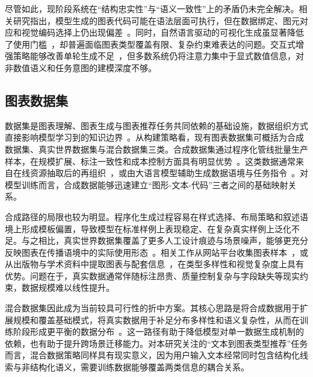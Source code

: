 尽管如此，现阶段系统在“结构忠实性”与“语义一致性”上的矛盾仍未完全解决。相关研究指出，模型生成的图表代码可能在语法层面可执行，但在数据绑定、图元对应和视觉编码选择上仍出现偏差~\cite{kondic_chartgen_2025}。同时，自然语言驱动的可视化生成虽显著降低了使用门槛~\cite{wang_towards_2022,lu_automatic_2021,wang_making_2023}，却普遍面临图表类型覆盖有限、复杂约束难表达的问题。交互式增强策略能够改善单轮生成不足~\cite{masson_charagraph_2023,zou_gistvis_2025}，但多数系统仍将注意力集中于显式数值信息，对非数值语义和任务意图的建模深度不够。


\subsection{图表数据集}

数据集是图表理解、图表生成与图表推荐任务共同依赖的基础设施，数据组织方式直接影响模型学习到的知识边界~\cite{hu_novachart_2024}。从构建策略看，现有图表数据集可概括为合成数据集、真实世界数据集与混合数据集三类。合成数据集通过程序化管线批量生产样本，在规模扩展、标注一致性和成本控制方面具有明显优势~\cite{kafle_dvqa_2018}。这类数据通常来自在线资源抽取后的再组织~\cite{tang_vistext_2023,akhtar_reading_2023,li_chartgalaxy_2025}，或由大语言模型辅助生成数据语境与任务指令~\cite{xia_chartx_2025,zhao_chartcoder_2025}。对模型训练而言，合成数据能够迅速建立“图形-文本-代码”三者之间的基础映射关系。

合成路径的局限也较为明显。程序化生成过程容易在样式选择、布局策略和叙述语境上形成模板偏置，导致模型在标准样例上表现稳定、在复杂真实样例上泛化不足。与之相比，真实世界数据集覆盖了更多人工设计痕迹与场景噪声，能够更充分反映图表在传播语境中的实际使用形态~\cite{zhou_table2charts_2021}。相关工作从网站平台收集图表样本~\cite{savva_revision_2011,kantharaj_chart--text_2022,masry_chartqa_2022,huang_evochart_2025}，或从出版物与学术资料中提取图表与配套信息~\cite{wu_plot2code_2025,yang_matplotagent_2024,wang_charxiv_2024,zhang_is_2024}，在类型多样性和视觉复杂度上具有优势。问题在于，真实数据通常伴随标注昂贵、质量控制复杂与字段缺失等现实约束，数据规模难以线性提升。

混合数据集因此成为当前较具可行性的折中方案。其核心思路是将合成数据用于扩展规模和覆盖基础模式，将真实数据用于补足分布多样性和语义复杂性，从而在训练阶段形成更平衡的数据分布~\cite{liu_deplot_2023,meng_chartassistant_2024,liu_matcha_2023}。这一路径有助于降低模型对单一数据生成机制的依赖，也有助于提升跨场景迁移能力。对本研究关注的“文本到图表类型推荐”任务而言，混合数据策略同样具有现实意义，因为用户输入文本经常同时包含结构化线索与非结构化语义，需要训练数据能够覆盖两类信息的耦合关系。

